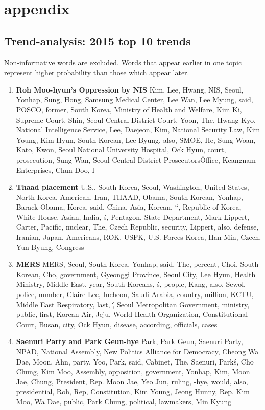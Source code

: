 \section{appendix}
\subsection{Trend-analysis: 2015 top 10 trends}
Non-informative words are excluded. Words that appear earlier in one topic
represent higher probability than those which appear later.
\begin{enumerate}
  \item \textbf{Roh Moo-hyun's Oppression by NIS} Kim, Lee, Hwang, NIS, Seoul, Yonhap, Sung, Hong, Samsung Medical Center, Lee Wan, Lee Myung, said, POSCO, former, South Korea, Ministry of Health and Welfare, Kim Ki, Supreme Court, Shin, Seoul Central District Court, Yoon, The, Hwang Kyo, National Intelligence Service, Lee, Daejeon,  Kim, National Security Law, Kim Young, Kim Hyun, South Korean, Lee Byung, also, SMOE, He, Sung Woan, Kato, Kwon, Seoul National University Hospital, Ock Hyun, court, prosecution, Sung Wan, Seoul Central District Prosecutors\' Office, Keangnam Enterprises, Chun Doo, I
  \item \textbf{Thaad placement} U.S., South Korea, Seoul, Washington, United States, North Korea, American, Iran, THAAD, Obama, South Korean, Yonhap, Barack Obama, Korea, said, China, Asia, Korean, ``, Republic of Korea, White House, Asian, India, \'s, Pentagon, State Department, Mark Lippert, Carter, Pacific, nuclear, The, Czech Republic, security, Lippert, also, defense, Iranian, Japan, Americans, ROK, USFK, U.S. Forces Korea, Han Min, Czech, Yun Byung, Congress
  \item \textbf{MERS} MERS, Seoul, South Korea, Yonhap, said, The, percent, Choi, South Korean, Cho, government, Gyeonggi Province, Seoul City, Lee Hyun, Health Ministry, Middle East, year, South Koreans, \'s, people, Kang, also, Sewol, police, number, Claire Lee, Incheon, Saudi Arabia, country, million, KCTU, Middle East Respiratory, last, \'\', Seoul Metropolitan Government, ministry, public, first, Korean Air, Jeju, World Health Organization, Constitutional Court, Busan, city, Ock Hyun, disease, according, officials, cases
  \item \textbf{Saenuri Party and Park Geun-hye} Park, Park Geun, Saenuri Party, NPAD, National Assembly, New Politics Alliance for Democracy, Cheong Wa Dae, Moon, Ahn, party, Yoo, Park, said, Cabinet, The, Saenuri, Park\'s, Cho Chung, Kim Moo, Assembly, opposition, government, Yonhap, Kim, Moon Jae, Chung, President, Rep. Moon Jae, Yeo Jun, ruling, -hye, would, also, presidential, Roh, Rep, Constitution, Kim Young, Jeong Hunny, Rep. Kim Moo, Wa Dae, public, Park Chung, political, lawmakers, Min Kyung

\end{enumerate}
